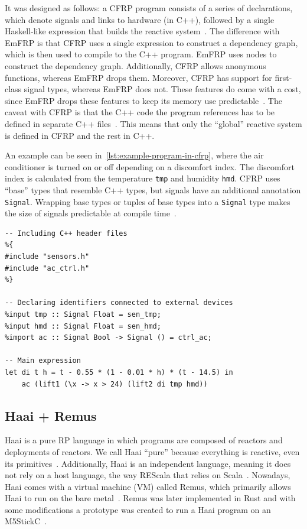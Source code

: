 \documentclass[a4paper]{book}
\begin{document}
It was designed as follows: a CFRP program consists of a series of declarations,
which denote signals and links to hardware (in C++), followed by a single
Haskell-like expression that builds the reactive
system~\cite{suzuki_cfrp_embedded}. The difference with EmFRP is that CFRP uses
a single expression to construct a dependency graph, which is then used to
compile to the C++ program. EmFRP uses nodes to construct the dependency graph.
Additionally, CFRP allows anonymous functions, whereas EmFRP drops them.
Moreover, CFRP has support for first-class signal types, whereas EmFRP does not.
These features do come with a cost, since EmFRP drops these features to keep its
memory use predictable~\cite{suzuki_cfrp_embedded}. The caveat with CFRP is that
the C++ code the program references has to be defined in separate C++
files~\cite{suzuki_cfrp_embedded}. This means that only the \enquote{global}
reactive system is defined in CFRP and the rest in C++.
\par
An example can be seen in~\cref{lst:example-program-in-cfrp}, where the air
conditioner is turned on or off depending on a discomfort index. The discomfort
index is calculated from the temperature \texttt{tmp} and humidity \texttt{hmd}.
CFRP uses \enquote{base} types that resemble C++ types, but signals have an
additional annotation \texttt{Signal}. Wrapping base types or tuples of base
types into a \texttt{Signal} type makes the size of signals predictable at
compile time~\cite{suzuki_cfrp_embedded}.
\begin{listing}[ht]
    \begin{lstlisting}[language=cfrp]
-- Including C++ header files
%{
#include "sensors.h"
#include "ac_ctrl.h"
%}

-- Declaring identifiers connected to external devices
%input tmp :: Signal Float = sen_tmp;
%input hmd :: Signal Float = sen_hmd;
%import ac :: Signal Bool -> Signal () = ctrl_ac;

-- Main expression
let di t h = t - 0.55 * (1 - 0.01 * h) * (t - 14.5) in
    ac (lift1 (\x -> x > 24) (lift2 di tmp hmd))\end{lstlisting}
    \caption{Example program in CFRP~\cite{suzuki_cfrp_embedded}}
    \label{lst:example-program-in-cfrp}
\end{listing}
\subsection{Haai + Remus}
\label{sec:haai-remus}
Haai is a pure RP language in which programs are composed of reactors and
deployments of reactors. We call Haai \enquote{pure} because everything is
reactive, even its primitives~\cite{oeyen2024reactive}. Additionally, Haai is an
independent language, meaning it does not rely on a host language, the way
REScala that relies on Scala~\cite{surveyRP2024}. Nowadays, Haai comes with a
virtual machine (VM) called Remus, which primarily allows Haai to run on the
bare metal~\cite{rpbaremetal2022,oeyen2024virtual}. Remus was later implemented
in Rust and with some modifications a prototype was created to run a Haai
program on an M5StickC~\cite{descheemaeker2023compilation}.
\end{document}
